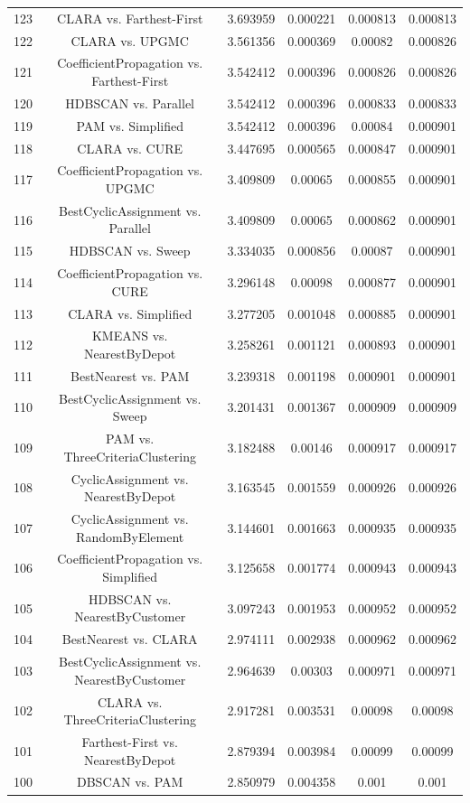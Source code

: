 \documentclass[a4paper,10pt]{article}
\begin{document}
\begin{landscape}
\begin{table}[!htp]
\begin{tabular}{cccccc}
123&CLARA vs. Farthest-First&3.693959&0.000221&0.000813&0.000813\\
122&CLARA vs. UPGMC&3.561356&0.000369&0.00082&0.000826\\
121&CoefficientPropagation vs. Farthest-First&3.542412&0.000396&0.000826&0.000826\\
120&HDBSCAN vs. Parallel&3.542412&0.000396&0.000833&0.000833\\
119&PAM vs. Simplified&3.542412&0.000396&0.00084&0.000901\\
118&CLARA vs. CURE&3.447695&0.000565&0.000847&0.000901\\
117&CoefficientPropagation vs. UPGMC&3.409809&0.00065&0.000855&0.000901\\
116&BestCyclicAssignment vs. Parallel&3.409809&0.00065&0.000862&0.000901\\
115&HDBSCAN vs. Sweep&3.334035&0.000856&0.00087&0.000901\\
114&CoefficientPropagation vs. CURE&3.296148&0.00098&0.000877&0.000901\\
113&CLARA vs. Simplified&3.277205&0.001048&0.000885&0.000901\\
112&KMEANS vs. NearestByDepot&3.258261&0.001121&0.000893&0.000901\\
111&BestNearest vs. PAM&3.239318&0.001198&0.000901&0.000901\\
110&BestCyclicAssignment vs. Sweep&3.201431&0.001367&0.000909&0.000909\\
109&PAM vs. ThreeCriteriaClustering&3.182488&0.00146&0.000917&0.000917\\
108&CyclicAssignment vs. NearestByDepot&3.163545&0.001559&0.000926&0.000926\\
107&CyclicAssignment vs. RandomByElement&3.144601&0.001663&0.000935&0.000935\\
106&CoefficientPropagation vs. Simplified&3.125658&0.001774&0.000943&0.000943\\
105&HDBSCAN vs. NearestByCustomer&3.097243&0.001953&0.000952&0.000952\\
104&BestNearest vs. CLARA&2.974111&0.002938&0.000962&0.000962\\
103&BestCyclicAssignment vs. NearestByCustomer&2.964639&0.00303&0.000971&0.000971\\
102&CLARA vs. ThreeCriteriaClustering&2.917281&0.003531&0.00098&0.00098\\
101&Farthest-First vs. NearestByDepot&2.879394&0.003984&0.00099&0.00099\\
100&DBSCAN vs. PAM&2.850979&0.004358&0.001&0.001\\

\end{tabular}
\end{table}
\end{landscape}
\end{document}
